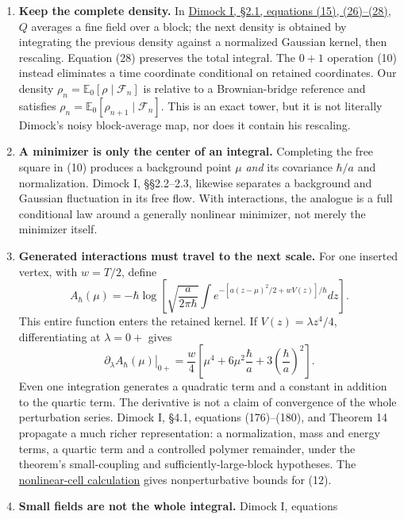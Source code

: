 \documentclass[11pt,a4paper]{article}
\begin{document}
\begin{enumerate}
\def\labelenumi{\arabic{enumi}.}
\item
  \textbf{Keep the complete density.} In
  \href{https://arxiv.org/html/1108.1335v2}{Dimock I, §2.1, equations
  (15), (26)--(28)}, \(Q\) averages a fine field over a block; the next
  density is obtained by integrating the previous density against a
  normalized Gaussian kernel, then rescaling. Equation (28) preserves
  the total integral. The \(0+1\) operation (10) instead eliminates a
  time coordinate conditional on retained coordinates. Our density
  \(\rho_n=\mathbb E_0[\rho\mid\mathcal F_n]\) is relative to a
  Brownian-bridge reference and satisfies
  \(\rho_n=\mathbb E_0[\rho_{n+1}\mid\mathcal F_n]\). This is an exact
  tower, but it is not literally Dimock's noisy block-average map, nor
  does it contain his rescaling.
\item
  \textbf{A minimizer is only the center of an integral.} Completing the
  free square in (10) produces a background point \(\mu\) \emph{and} its
  covariance \(\hbar/a\) and normalization. Dimock I, §§2.2--2.3,
  likewise separates a background and Gaussian fluctuation in its free
  flow. With interactions, the analogue is a full conditional law around
  a generally nonlinear minimizer, not merely the minimizer itself.
\item
  \textbf{Generated interactions must travel to the next scale.} For one
  inserted vertex, with \(w=T/2\), define \[
  A_\hbar(\mu)=-\hbar\log\left[
   \sqrt{\frac a{2\pi\hbar}}\int
      e^{-[a(z-\mu)^2/2+wV(z)]/\hbar}dz\right].\tag{12}
  \] This entire function enters the retained kernel. If
  \(V(z)=\lambda z^4/4\), differentiating at \(\lambda=0+\) gives \[
  \left.\partial_\lambda A_\hbar(\mu)\right|_{0+}
   =\frac w4\left[\mu^4+6\mu^2\frac{\hbar}{a}
                        +3\left(\frac{\hbar}{a}\right)^2\right].\tag{13}
  \] Even one integration generates a quadratic term and a constant in
  addition to the quartic term. The derivative is not a claim of
  convergence of the whole perturbation series. Dimock I, §4.1,
  equations (176)--(180), and Theorem 14 propagate a much richer
  representation: a normalization, mass and energy terms, a quartic term
  and a controlled polymer remainder, under the theorem's small-coupling
  and sufficiently-large-block hypotheses. The
  \href{newton-nonlinear-time-cell.md}{nonlinear-cell calculation} gives
  nonperturbative bounds for (12).
\item
  \textbf{Small fields are not the whole integral.} Dimock I, equations

\end{enumerate}
\end{document}
